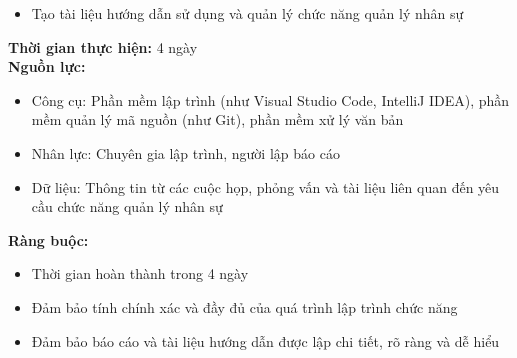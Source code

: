 {\begin{minipage}{\textwidth}
\begin{itemize}
        \item Tạo tài liệu hướng dẫn sử dụng và quản lý chức năng quản lý nhân sự
    \end{itemize}
    \noindent \textbf{Thời gian thực hiện:} 4 ngày \\
    \noindent \textbf{Nguồn lực:}
    \begin{itemize}
        \item Công cụ: Phần mềm lập trình (như Visual Studio Code, IntelliJ IDEA), phần mềm quản lý mã nguồn (như Git), phần mềm xử lý văn bản
        \item Nhân lực: Chuyên gia lập trình, người lập báo cáo
        \item Dữ liệu: Thông tin từ các cuộc họp, phỏng vấn và tài liệu liên quan đến yêu cầu chức năng quản lý nhân sự
    \end{itemize}
    \noindent \textbf{Ràng buộc:}
    \begin{itemize}
        \item Thời gian hoàn thành trong 4 ngày
        \item Đảm bảo tính chính xác và đầy đủ của quá trình lập trình chức năng
        \item Đảm bảo báo cáo và tài liệu hướng dẫn được lập chi tiết, rõ ràng và dễ hiểu
    \end{itemize}
    \end{minipage}
}
\newpage
{}    
